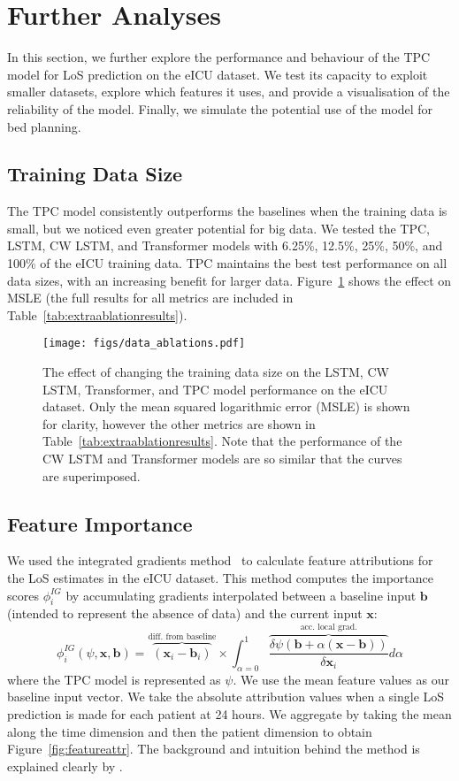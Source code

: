 \documentclass[sigconf]{acmart}
\begin{document}
\section{Further Analyses}
In this section, we further explore the performance and behaviour of the TPC model for LoS prediction on the eICU dataset. We test its capacity to exploit smaller datasets, explore which features it uses, and provide a visualisation of the reliability of the model. Finally, we simulate the potential use of the model for bed planning.

\subsection{Training Data Size}
The TPC model consistently outperforms the baselines when the training data is small, but we noticed even greater potential for big data. We tested the TPC, LSTM, CW LSTM, and Transformer models with 6.25\%, 12.5\%, 25\%, 50\%, and 100\% of the eICU training data. TPC maintains the best test performance on all data sizes, with an increasing benefit for larger data. Figure~\ref{fig:datasize} shows the effect on MSLE (the full results for all metrics are included in Table~\ref{tab:extraablationresults}).

\begin{figure}[h]
  \centering
  \texttt{[image: figs/data\_ablations.pdf]}
  \caption{The effect of changing the training data size on the LSTM, CW LSTM, Transformer, and TPC model performance on the eICU dataset. Only the mean squared logarithmic error (MSLE) is shown for clarity, however the other metrics are shown in Table~\ref{tab:extraablationresults}. Note that the performance of the CW LSTM and Transformer models are so similar that the curves are superimposed.}
  \label{fig:datasize}
\end{figure}

\subsection{Feature Importance}
We used the integrated gradients method~\citep{integratedgradients} to calculate feature attributions for the LoS estimates in the eICU dataset. This method computes the importance scores $\phi_i^{IG}$ by accumulating gradients interpolated between a baseline input $\textbf{b}$ (intended to represent the absence of data) and the current input $\textbf{x}$:
\begin{equation}
    \phi_i^{IG}(\psi, \textbf{x}, \textbf{b}) = \overbrace{(\textbf{x}_i - \textbf{b}_i)}^{\text{diff. from baseline}} \times \int_{\alpha=0}^{1}\overbrace{\frac{\delta \psi (\textbf{b} + \alpha(\textbf{x} - \textbf{b}))}{\delta \textbf{x}_i}}^{\text{acc. local grad.}}d \alpha
\end{equation}
where the TPC model is represented as $\psi$. We use the mean feature values as our baseline input vector. We take the absolute attribution values when a single LoS prediction is made for each patient at 24 hours. We aggregate by taking the mean along the time dimension and then the patient dimension to obtain Figure~\ref{fig:featureattr}. The background and intuition behind the method is explained clearly by \citet{sturmfels2020visualizing}. 
\end{document}

